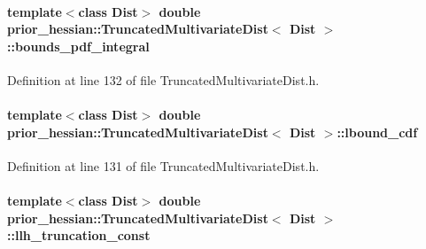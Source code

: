 \paragraph[{\texorpdfstring{bounds\+\_\+pdf\+\_\+integral}{bounds_pdf_integral}}]{\setlength{\rightskip}{0pt plus 5cm}template$<$class Dist$>$ double {\bf prior\+\_\+hessian\+::\+Truncated\+Multivariate\+Dist}$<$ Dist $>$\+::bounds\+\_\+pdf\+\_\+integral\hspace{0.3cm}{\ttfamily [protected]}}\hypertarget{classprior__hessian_1_1TruncatedMultivariateDist_a1685d6c30bd68315d20a8367b38e30f4}{}\label{classprior__hessian_1_1TruncatedMultivariateDist_a1685d6c30bd68315d20a8367b38e30f4}


Definition at line 132 of file Truncated\+Multivariate\+Dist.\+h.

\paragraph[{\texorpdfstring{lbound\+\_\+cdf}{lbound_cdf}}]{\setlength{\rightskip}{0pt plus 5cm}template$<$class Dist$>$ double {\bf prior\+\_\+hessian\+::\+Truncated\+Multivariate\+Dist}$<$ Dist $>$\+::lbound\+\_\+cdf\hspace{0.3cm}{\ttfamily [protected]}}\hypertarget{classprior__hessian_1_1TruncatedMultivariateDist_a8c7ed29f5fe119b5451a56d89027d35b}{}\label{classprior__hessian_1_1TruncatedMultivariateDist_a8c7ed29f5fe119b5451a56d89027d35b}


Definition at line 131 of file Truncated\+Multivariate\+Dist.\+h.

\paragraph[{\texorpdfstring{llh\+\_\+truncation\+\_\+const}{llh_truncation_const}}]{\setlength{\rightskip}{0pt plus 5cm}template$<$class Dist$>$ double {\bf prior\+\_\+hessian\+::\+Truncated\+Multivariate\+Dist}$<$ Dist $>$\+::llh\+\_\+truncation\+\_\+const\hspace{0.3cm}{\ttfamily [protected]}}\hypertarget{classprior__hessian_1_1TruncatedMultivariateDist_aaf6c13180dd673f90ec8fc155c7beb2f}{}\label{classprior__hessian_1_1TruncatedMultivariateDist_aaf6c13180dd673f90ec8fc155c7beb2f}


